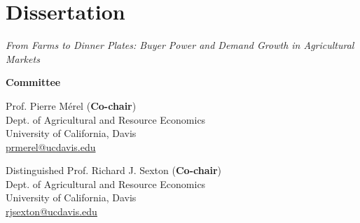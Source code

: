 \documentclass{article}[12]
\begin{document}

\section{Dissertation}

\emph{From Farms to Dinner Plates: Buyer Power and Demand Growth in Agricultural Markets}

\vspace{1\baselineskip plus 10pt minus 10pt}

\textbf{Committee}

\begin{minipage}{.5\textwidth}
Prof. Pierre M\'erel (\textbf{Co-chair}) \\
Dept. of Agricultural and Resource Economics \\
University of California, Davis\\
\href{mailto:prmerel@ucdavis.edu}{prmerel@ucdavis.edu}
\end{minipage}%
%
%
\begin{minipage}{0.5\textwidth}
Distinguished Prof. Richard J. Sexton (\textbf{Co-chair})\\
Dept. of Agricultural and Resource Economics \\
University of California, Davis \\
\href{mailto:rjsexton@ucdavis.edu}{rjsexton@ucdavis.edu}
\end{minipage}
\end{document}
